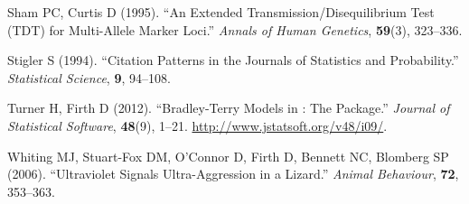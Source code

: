 \begin{thebibliography}{22}
Sham PC, Curtis D (1995).
\newblock \enquote{An Extended Transmission/Disequilibrium Test ({TDT}) for
  Multi-Allele Marker Loci.}
\newblock \emph{Annals of Human Genetics}, \textbf{59}(3), 323--336.

Stigler S (1994).
\newblock \enquote{Citation Patterns in the Journals of Statistics and
  Probability.}
\newblock \emph{Statistical Science}, \textbf{9}, 94--108.

Turner H, Firth D (2012).
\newblock \enquote{Bradley-Terry Models in : The
   Package.}
\newblock \emph{Journal of Statistical Software}, \textbf{48}(9), 1--21.
\newblock \urlprefix\url{http://www.jstatsoft.org/v48/i09/}.

Whiting MJ, Stuart-Fox DM, O'Connor D, Firth D, Bennett NC, Blomberg SP
  ({2006}).
\newblock \enquote{{Ultraviolet Signals Ultra-Aggression in a Lizard}.}
\newblock \emph{Animal Behaviour}, \textbf{{72}}, 353--363.

\end{thebibliography}




